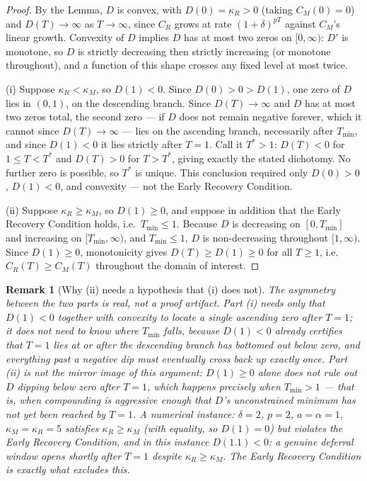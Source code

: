 \documentclass[11pt]{article}
\newtheorem*{remark}{Remark}
\begin{document}
\begin{proof}
By the Lemma, $D$ is convex, with $D(0) = \kappa_R > 0$ (taking $C_M(0) = 0$) and $D(T) \to \infty$ as $T \to \infty$, since $C_R$ grows at rate $(1+\delta)^{pT}$ against $C_M$'s linear growth. Convexity of $D$ implies $D$ has at most two zeros on $[0,\infty)$: $D'$ is monotone, so $D$ is strictly decreasing then strictly increasing (or monotone throughout), and a function of this shape crosses any fixed level at most twice.

(i) Suppose $\kappa_R < \kappa_M$, so $D(1) < 0$. Since $D(0) > 0 > D(1)$, one zero of $D$ lies in $(0,1)$, on the descending branch. Since $D(T)\to\infty$ and $D$ has at most two zeros total, the second zero — if $D$ does not remain negative forever, which it cannot since $D(T)\to\infty$ — lies on the ascending branch, necessarily after $T_{\min}$, and since $D(1)<0$ it lies strictly after $T=1$. Call it $T^*>1$: $D(T)<0$ for $1\leq T<T^*$ and $D(T)>0$ for $T>T^*$, giving exactly the stated dichotomy. No further zero is possible, so $T^*$ is unique. This conclusion required only $D(0)>0$, $D(1)<0$, and convexity — not the Early Recovery Condition.

(ii) Suppose $\kappa_R \geq \kappa_M$, so $D(1) \geq 0$, and suppose in addition that the Early Recovery Condition holds, i.e.\ $T_{\min}\leq 1$. Because $D$ is decreasing on $[0,T_{\min}]$ and increasing on $[T_{\min},\infty)$, and $T_{\min}\leq 1$, $D$ is non-decreasing throughout $[1,\infty)$. Since $D(1)\geq 0$, monotonicity gives $D(T)\geq D(1)\geq 0$ for all $T\geq 1$, i.e.\ $C_R(T)\geq C_M(T)$ throughout the domain of interest.
\end{proof}

\begin{remark}[Why (ii) needs a hypothesis that (i) does not]
The asymmetry between the two parts is real, not a proof artifact. Part (i) needs only that $D(1)<0$ together with convexity to locate a single ascending zero after $T=1$; it does not need to know where $T_{\min}$ falls, because $D(1)<0$ already certifies that $T=1$ lies at or after the descending branch has bottomed out below zero, and everything past a negative dip must eventually cross back up exactly once. Part (ii) is not the mirror image of this argument: $D(1)\geq 0$ alone does not rule out $D$ dipping below zero \emph{after} $T=1$, which happens precisely when $T_{\min}>1$ — that is, when compounding is aggressive enough that $D$'s unconstrained minimum has not yet been reached by $T=1$. A numerical instance: $\delta=2$, $p=2$, $a=\alpha=1$, $\kappa_M=\kappa_R=5$ satisfies $\kappa_R\geq\kappa_M$ (with equality, so $D(1)=0$) but violates the Early Recovery Condition, and in this instance $D(1.1)<0$: a genuine deferral window opens shortly after $T=1$ despite $\kappa_R\geq\kappa_M$. The Early Recovery Condition is exactly what excludes this.
\end{remark}
\end{document}
